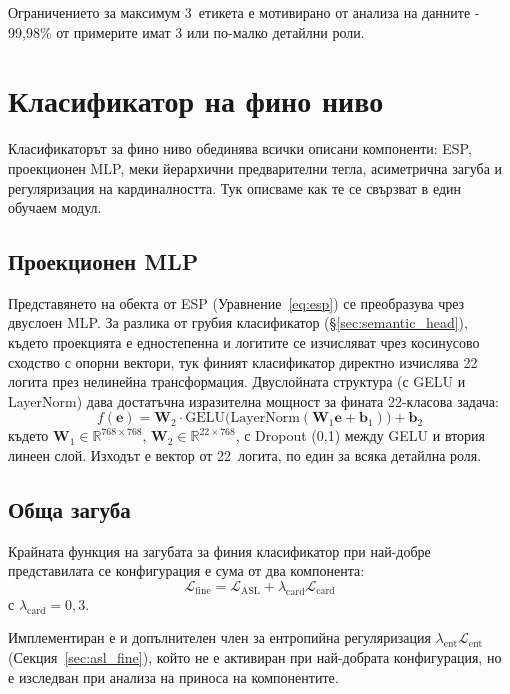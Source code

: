 \documentclass[12pt,a4paper]{report}
\begin{document}
Ограничението за максимум 3~етикета е мотивирано от анализа на данните - 99,98\% от примерите имат 3 или по-малко детайлни роли.


\section{Класификатор на фино ниво}
\label{sec:fine_classifier}

Класификаторът за фино ниво обединява всички описани компоненти: ESP, проекционен MLP, меки йерархични предварителни тегла, асиметрична загуба и регуляризация на кардиналността. Тук описваме как те се свързват в един обучаем модул.

\subsection{Проекционен MLP}

Представянето на обекта от ESP (Уравнение~\ref{eq:esp}) се преобразува чрез двуслоен MLP. За разлика от грубия класификатор (§\ref{sec:semantic_head}), където проекцията е едностепенна и логитите се изчисляват чрез косинусово сходство с опорни вектори, тук финият класификатор директно изчислява 22 логита през нелинейна трансформация. Двуслойната структура (с GELU и LayerNorm) дава достатъчна изразителна мощност за фината 22-класова задача:
\begin{equation}
  f(\mathbf{e}) = \mathbf{W}_2 \cdot \text{GELU}\bigl(\text{LayerNorm}(\mathbf{W}_1 \mathbf{e} + \mathbf{b}_1)\bigr) + \mathbf{b}_2
  \label{eq:entity_projection}
\end{equation}
където $\mathbf{W}_1 \in \mathbb{R}^{768 \times 768}$, $\mathbf{W}_2 \in \mathbb{R}^{22 \times 768}$, с Dropout (0,1) между GELU и втория линеен слой. Изходът е вектор от 22~логита, по един за всяка детайлна роля.

\subsection{Обща загуба}

Крайната функция на загубата за финия класификатор при най-добре представилата се конфигурация е сума от два компонента:
\begin{equation}
  \mathcal{L}_{\text{fine}} = \mathcal{L}_{\text{ASL}} + \lambda_{\text{card}} \mathcal{L}_{\text{card}}
  \label{eq:total_fine_loss}
\end{equation}
с $\lambda_{\text{card}}=0{,}3$.

Имплементиран е и допълнителен член за ентропийна регуляризация $\lambda_{\text{ent}} \mathcal{L}_{\text{ent}}$ (Секция~\ref{sec:asl_fine}), който не е активиран при най-добрата конфигурация, но е изследван при анализа на приноса на компонентите.
\end{document}
